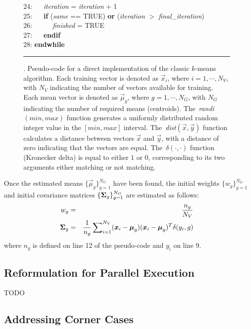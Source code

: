 \begin{figure}[!b]
\begin{small}
\begin{tabbing}
24: ~~ {\it iteration} = {\it iteration} + 1 \\
25: ~~ {\bf if} ({\it same} == TRUE) {\bf or} ({\it iteration} $>$ {\it final\_iteration})  \\
26: ~~ ~~ {\it finished} = TRUE \\
27: ~~ {\bf endif} \\
28: {\bf endwhile}
\end{tabbing}
\end{small}
\vspace{-1ex}
\hrule
\caption
  {
  \small
  .
  Pseudo-code for a direct implementation of the classic $k$-means algorithm.
  Each training vector is denoted as $\Vec{x}_i$, where $i = 1, \cdots, N_V$, with $N_V$ indicating the number of vectors available for training.
  Each mean vector is denoted as $\Vec{\mu}_g$, where $g = 1, \cdots, N_G$, with $N_G$ indicating the number of required means (centroids).
  The~{\it randi}$(min,max)$ function generates a uniformly distributed random integer value in the $[min,max]$ interval.
  The~{\it dist}$(\Vec{x},\Vec{y})$ function calculates a distance between vectors $\Vec{x}$ and $\Vec{y}$, with a distance of zero indicating that the vectors are equal.
  The~$\delta(\cdot,\cdot)$ function (Kronecker delta) is equal to either $1$ or $0$, corresponding to its two arguments either matching or not matching.
  }
\label{fig:kmeans_pseudocode}
\end{figure}

Once the estimated means $\{ \Vec{\mu}_g \}_{g=1}^{N_G}$ have been found,
the initial weights $\{ w_g \}_{g=1}^{N_G}$ and initial covariance matrices $\{ {{\boldsymbol{\Sigma}}_g} \}_{g=1}^{N_G}$
are estimated as follows:
%
\begin{eqnarray}
w_g & = & \frac{n_g}{N_V} \\
{\mbox {\boldmath $\Sigma$}_g} & = & \frac{1}{n_g} \sum\nolimits_{i=1}^{N_V} (\Vec{x}_i - \Vec{\mu}_g)(\Vec{x}_i - \Vec{\mu}_g)^T \delta(y_i, g)
\label{eqn:k-means_cov}
\end{eqnarray}
%
\noindent
where $n_g$ is defined on line 12 of the pseudo-code and $y_i$ on line 9.


\subsection{Reformulation for Parallel Execution}

TODO


\subsection{Addressing Corner Cases}

